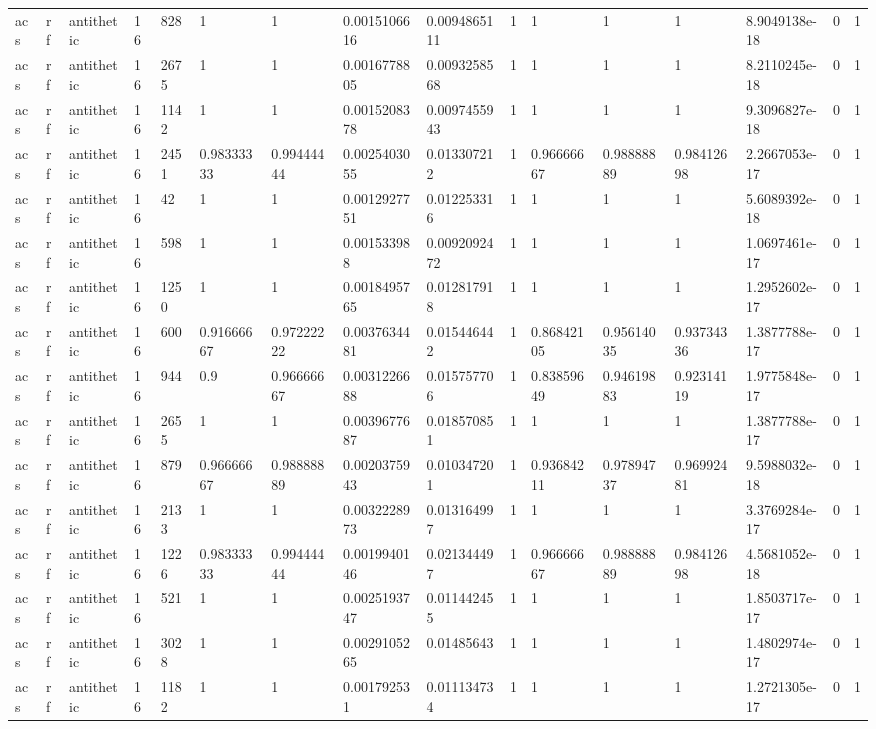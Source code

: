 \begin{tabular}{llllllllllllllll}
acs & rf & antithetic & 16 & 828 & 1 & 1 & 0.0015106616 & 0.0094865111 & 1 & 1 & 1 & 1 & 8.9049138e-18 & 0 & 1 \\
acs & rf & antithetic & 16 & 2675 & 1 & 1 & 0.0016778805 & 0.0093258568 & 1 & 1 & 1 & 1 & 8.2110245e-18 & 0 & 1 \\
acs & rf & antithetic & 16 & 1142 & 1 & 1 & 0.0015208378 & 0.0097455943 & 1 & 1 & 1 & 1 & 9.3096827e-18 & 0 & 1 \\
acs & rf & antithetic & 16 & 2451 & 0.98333333 & 0.99444444 & 0.0025403055 & 0.013307212 & 1 & 0.96666667 & 0.98888889 & 0.98412698 & 2.2667053e-17 & 0 & 1 \\
acs & rf & antithetic & 16 & 42 & 1 & 1 & 0.0012927751 & 0.012253316 & 1 & 1 & 1 & 1 & 5.6089392e-18 & 0 & 1 \\
acs & rf & antithetic & 16 & 598 & 1 & 1 & 0.001533988 & 0.0092092472 & 1 & 1 & 1 & 1 & 1.0697461e-17 & 0 & 1 \\
acs & rf & antithetic & 16 & 1250 & 1 & 1 & 0.0018495765 & 0.012817918 & 1 & 1 & 1 & 1 & 1.2952602e-17 & 0 & 1 \\
acs & rf & antithetic & 16 & 600 & 0.91666667 & 0.97222222 & 0.0037634481 & 0.015446442 & 1 & 0.86842105 & 0.95614035 & 0.93734336 & 1.3877788e-17 & 0 & 1 \\
acs & rf & antithetic & 16 & 944 & 0.9 & 0.96666667 & 0.0031226688 & 0.015757706 & 1 & 0.83859649 & 0.94619883 & 0.92314119 & 1.9775848e-17 & 0 & 1 \\
acs & rf & antithetic & 16 & 2655 & 1 & 1 & 0.0039677687 & 0.018570851 & 1 & 1 & 1 & 1 & 1.3877788e-17 & 0 & 1 \\
acs & rf & antithetic & 16 & 879 & 0.96666667 & 0.98888889 & 0.0020375943 & 0.010347201 & 1 & 0.93684211 & 0.97894737 & 0.96992481 & 9.5988032e-18 & 0 & 1 \\
acs & rf & antithetic & 16 & 2133 & 1 & 1 & 0.0032228973 & 0.013164997 & 1 & 1 & 1 & 1 & 3.3769284e-17 & 0 & 1 \\
acs & rf & antithetic & 16 & 1226 & 0.98333333 & 0.99444444 & 0.0019940146 & 0.021344497 & 1 & 0.96666667 & 0.98888889 & 0.98412698 & 4.5681052e-18 & 0 & 1 \\
acs & rf & antithetic & 16 & 521 & 1 & 1 & 0.0025193747 & 0.011442455 & 1 & 1 & 1 & 1 & 1.8503717e-17 & 0 & 1 \\
acs & rf & antithetic & 16 & 3028 & 1 & 1 & 0.0029105265 & 0.01485643 & 1 & 1 & 1 & 1 & 1.4802974e-17 & 0 & 1 \\
acs & rf & antithetic & 16 & 1182 & 1 & 1 & 0.001792531 & 0.011134734 & 1 & 1 & 1 & 1 & 1.2721305e-17 & 0 & 1 \\

\end{tabular}
